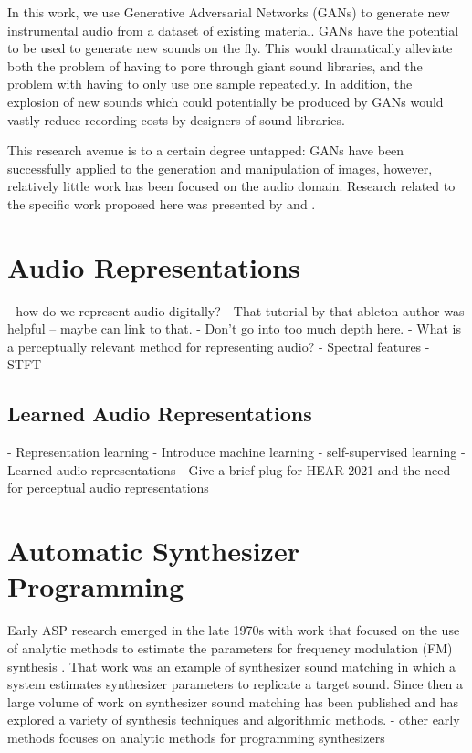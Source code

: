 In this work, we use Generative Adversarial Networks (GANs) \cite{goodfellow2014generative} to generate new instrumental audio from a dataset of existing material. GANs have the potential to be used to generate new sounds on the fly. This would dramatically alleviate both the problem of having to pore through giant sound libraries, and the problem with having to only use one sample repeatedly. In addition, the explosion of new sounds which could potentially be produced by GANs would vastly reduce recording costs by designers of sound libraries.

This research avenue is to a certain degree untapped: GANs have been successfully applied to the generation and manipulation of images, however, relatively little work has been focused on the audio domain. Research related to the specific work proposed here was presented by \cite{donahue2018adversarial}  and \cite{engel2018gansynth}.

\section{Audio Representations}
- how do we represent audio digitally?
- That tutorial by that ableton author was helpful -- maybe can link to that.
- Don't go into too much depth here.
- What is a perceptually relevant method for representing audio?
- Spectral features
- STFT

\subsection{Learned Audio Representations}
- Representation learning \cite{bengio2013representation}
- Introduce machine learning
- self-supervised learning
- Learned audio representations
- Give a brief plug for HEAR 2021 and the need for perceptual audio representations

\section{Automatic Synthesizer Programming}
Early ASP research emerged in the late 1970s with work that focused on the use of analytic methods to estimate the parameters for frequency modulation (FM) synthesis \cite{justice1979analytic}. That work was an example of synthesizer sound matching in which a system estimates synthesizer parameters to replicate a target sound. Since then a large volume of work on synthesizer sound matching has been published and has explored a variety of synthesis techniques and algorithmic methods.
- other early methods focuses on analytic methods for programming synthesizers \cite{beauchamp1982synthesis, payne1987microcomputer, delprat1990parameter}

